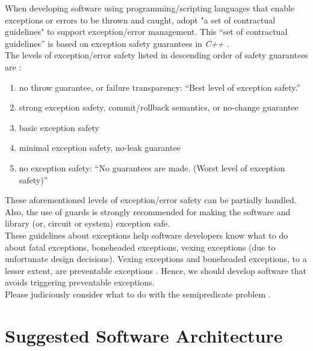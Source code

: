 \documentclass[letter,12pt]{article}
\begin{document}
When developing software using programming/scripting languages that enable exceptions or errors to be thrown and caught, adopt "a set of contractual guidelines" \cite{WikipediaContributors2016f} to support exception/error management. This ``set of contractual guidelines'' is based on exception safety guarantees in {\it C++} \cite{Abrahams1998,Abrahams2001,WikipediaContributors2016f} \cite[Subsection \S4.4 on ``Writing exception safe code'']{WikibooksContributors2016}. \\


The levels of exception/error safety listed in descending order of safety guarantees are \cite{Abrahams1998,Abrahams2001,WikibooksContributors2016,WikipediaContributors2016f}: \vspace{-0.3cm}
\begin{enumerate} \itemsep -4pt
\item no throw guarantee, or failure transparency: ``Best level of exception safety.''
\item strong exception safety, commit/rollback semantics, or no-change guarantee
\item basic exception safety
\item minimal exception safety, no-leak guarantee
\item no exception safety: ``No guarantees are made. (Worst level of exception safety)''
\end{enumerate}

These aforementioned levels of exception/error safety can be partially handled. Also, the use of guards is strongly recommended for making the software and library (or, circuit or system) exception safe. \\

These guidelines about exceptions help software developers know what to do about fatal exceptions, boneheaded exceptions, vexing exceptions (due to unfortunate design decisions). Vexing exceptions and boneheaded exceptions, to a lesser extent, are preventable exceptions \cite{Lippert2008}. Hence, we should develop software that avoids triggering preventable exceptions. \\

Please judiciously consider what to do with the semipredicate problem \cite{WikipediaContributors2016e}.



\section{Suggested Software Architecture}
\label{sec:SuggestedSoftwareArchitecture}
\end{document}
